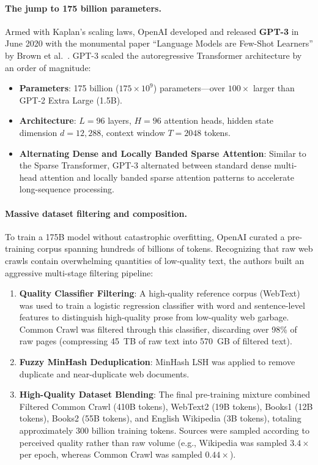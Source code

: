\documentclass[../../main.tex]{subfiles}
\begin{document}
\paragraph{The jump to 175 billion parameters.}
Armed with Kaplan's scaling laws, OpenAI developed and released \textbf{GPT-3} in June 2020 with the monumental paper ``Language Models are Few-Shot Learners'' by Brown et al.~\cite{brown2020}. 
GPT-3 scaled the autoregressive Transformer architecture by an order of magnitude:
\begin{itemize}
    \item \textbf{Parameters}: 175 billion ($175 \times 10^9$) parameters---over $100\times$ larger than GPT-2 Extra Large (1.5B).
    \item \textbf{Architecture}: $L = 96$ layers, $H = 96$ attention heads, hidden state dimension $d = 12,288$, context window $T = 2048$ tokens.
    \item \textbf{Alternating Dense and Locally Banded Sparse Attention}: Similar to the Sparse Transformer, GPT-3 alternated between standard dense multi-head attention and locally banded sparse attention patterns to accelerate long-sequence processing.
\end{itemize}

\paragraph{Massive dataset filtering and composition.}
To train a 175B model without catastrophic overfitting, OpenAI curated a pre-training corpus spanning hundreds of billions of tokens. Recognizing that raw web crawls contain overwhelming quantities of low-quality text, the authors built an aggressive multi-stage filtering pipeline:
\begin{enumerate}
    \item \textbf{Quality Classifier Filtering}: A high-quality reference corpus (WebText) was used to train a logistic regression classifier with word and sentence-level features to distinguish high-quality prose from low-quality web garbage. Common Crawl was filtered through this classifier, discarding over 98\% of raw pages (compressing 45~TB of raw text into 570~GB of filtered text).
    \item \textbf{Fuzzy MinHash Deduplication}: MinHash LSH was applied to remove duplicate and near-duplicate web documents.
    \item \textbf{High-Quality Dataset Blending}: The final pre-training mixture combined Filtered Common Crawl (410B tokens), WebText2 (19B tokens), Books1 (12B tokens), Books2 (55B tokens), and English Wikipedia (3B tokens), totaling approximately 300 billion training tokens. Sources were sampled according to perceived quality rather than raw volume (e.g., Wikipedia was sampled $3.4\times$ per epoch, whereas Common Crawl was sampled $0.44\times$).
\end{enumerate}
\end{document}
